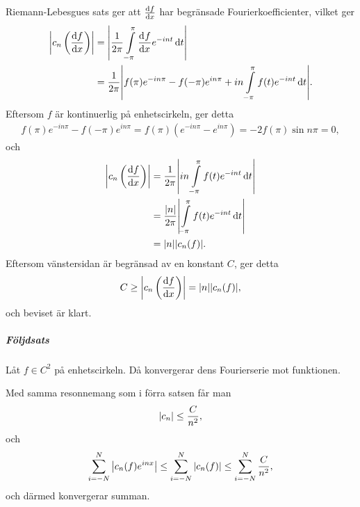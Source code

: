 \proof
Riemann-Lebesgues sats ger att $\dv{f}{x}$ har begränsade Fourierkoefficienter, vilket ger
\begin{align*}
	\abs{c_{n}\left(\dv{f}{x}\right)} &= \abs{\frac{1}{2\pi}\int\limits_{-\pi}^{\pi}\dv[]{f}{x} (t)e^{-int}\dd{t}} \\
	                                  &= \frac{1}{2\pi}\abs{f(\pi)e^{-in\pi} - f(-\pi)e^{in\pi} + in\int\limits_{-\pi}^{\pi}f(t)e^{-int}\dd{t}}.
\end{align*}
Eftersom $f$ är kontinuerlig på enhetscirkeln, ger detta
\begin{align*}
	f(\pi)e^{-in\pi} - f(-\pi)e^{in\pi} = f(\pi)(e^{-in\pi} - e^{in\pi}) = -2f(\pi)\sin{n\pi} = 0,
\end{align*}
och
\begin{align*}
	\abs{c_{n}\left(\dv{f}{x}\right)} &= \frac{1}{2\pi}\abs{in\int\limits_{-\pi}^{\pi}f(t)e^{-int}\dd{t}} \\
	                                  &= \frac{\abs{n}}{2\pi}\abs{\int\limits_{-\pi}^{\pi}f(t)e^{-int}\dd{t}} \\
	                                  &= \abs{n}\abs{c_{n}(f)}.
\end{align*}
Eftersom vänstersidan är begränsad av en konstant $C$, ger detta
\begin{align*}
	C \geq \abs{c_{n}\left(\dv{f}{x}\right)} = \abs{n}\abs{c_{n}(f)},
\end{align*}
och beviset är klart.

\subparagraph{Följdsats}
Låt $f\in C^{2}$ på enhetscirkeln. Då konvergerar dens Fourierserie mot funktionen.

\proof
Med samma resonnemang som i förra satsen får man
\begin{align*}
	\abs{c_{n}} \leq \frac{C}{n^{2}},
\end{align*}
och
\begin{align*}
	\sum\limits_{i = -N}^{N}\abs{c_{n}(f)e^{inx}} \leq \sum\limits_{i = -N}^{N}\abs{c_{n}(f)} \leq \sum\limits_{i = -N}^{N}\frac{C}{n^{2}},
\end{align*}
och därmed konvergerar summan.
